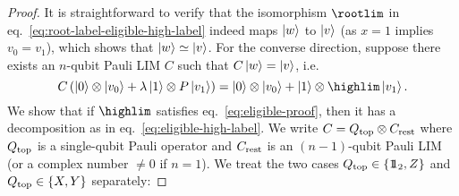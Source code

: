 \begin{proof}
    It is straightforward to verify that the isomorphism $\rootlim$ in eq.~\eqref{eq:root-label-eligible-high-label} indeed maps $\ket{w}$ to $\ket{v}$ (as $x = 1$ implies $v_0 = v_1$), which shows that $\ket{w} \simeq \ket{v}$.
    For the converse direction, suppose there exists an $n$-qubit Pauli LIM $C$ such that $C\ket{w} = \ket{v}$, i.e.
    \begin{equation}
        \label{eq:eligible-proof}
        C
        \left(\ket{0}\otimes \ket{v_0} + \lambda \ket{1} \otimes P \ket{v_1}\right)
        =
        \ket{0}\otimes \ket{v_0} + \ket{1} \otimes \highlim \ket{v_1}
        .
    \end{equation}
    We show that if $\highlim$ satisfies eq.~\eqref{eq:eligible-proof}, then it has a decomposition as in eq.~\eqref{eq:eligible-high-label}.
    \def\brest{C_{\textnormal{rest}}}
    \def\qtop{Q_{\textnormal{top}}}
    We write $C = \qtop \otimes \brest$ where $\qtop$ is a single-qubit Pauli operator and $\brest$ is an $(n-1)$-qubit Pauli LIM (or a complex number $\neq 0$ if $n=1$).
    We treat the two cases $\qtop \in \{\unit_2, Z\}$ and $\qtop \in \{X, Y\}$ separately:


\end{proof}

